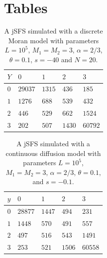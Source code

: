 \documentclass[preprint]{elsarticle}
\newcommand\x[1]{\ensuremath{X_{#1}}}
\newcommand\y{\ensuremath{Y}}
\begin{document}
\section*{Tables}

\begin{table}[ht]
\centering
\caption{A jSFS simulated with a discrete Moran model with parameters $L=10^5$, $M_1=M_2=3$, $\alpha=2/3$, $\theta=0.1$, $s=-40$ and $N=20$.}
  \begin{tabular}{lllll}
  \toprule
    $\y$&$0$&$1$&$2$&$3$\\
    \midrule
    $0$  &$29037$ &$1315$ &$436$  &$185$\\ 
    $1$  &$1276$  &$688$  &$539$  &$432$\\  
    $2$  &$446$   &$529$  &$662$  &$1524$\\  
    $3$  &$202$   &$507$  &$1430$ &$60792$\\
    \bottomrule
  \end{tabular}\label{jointSFSdiscr}
\end{table}

\begin{table}[ht]
\centering
\caption{A jSFS simulated with a continuous diffusion model with parameters $L=10^5$, $M_1=M_2=3$, $\alpha=2/3$, $\theta=0.1$, and $s=-0.1$.}
  \begin{tabular}{lllll}
  \toprule
    $y$&$0$&$1$&$2$&$3$\\
    \midrule
    $0$  &$28877$ &$1447$ &$494$  &$231$\\
    $1$  &$1448$  &$570$  &$491$  &$557$\\
    $2$  &$497$   &$516$  &$543$  &$1491$\\
    $3$  &$253$   &$521$  &$1506$ &$60558$\\
    \bottomrule
  \end{tabular}\label{jointSFScont}
\end{table}


\end{document}
